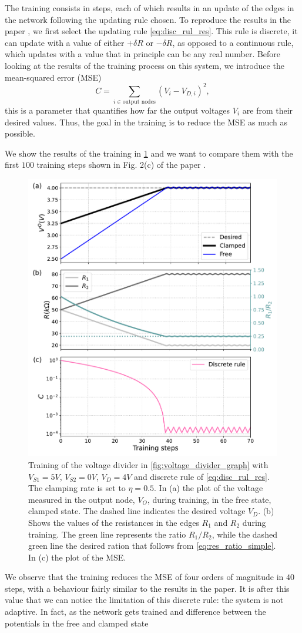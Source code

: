 \documentclass[10.5pt]{article}
\begin{document}
The training consists in steps, each of which results in an update of the edges in the network following the updating rule chosen. To reproduce the results in the paper \cite{Dillavou}, we first select the updating rule \cref{eq:disc_rul_res}. This rule is discrete, it can update with a value of either $+\delta R$ or $-\delta R$, as opposed to a continuous rule, which updates with a value that in principle can be any real number. Before looking at the results of the training process on this system, we introduce the mean-squared error (MSE)
\[
C = \sum_{i \in \text{output nodes}} (V_{i} - V_{D,i})^2,
\]
this is a parameter that quantifies how far the output voltages $V_i$ are from their desired values. Thus, the goal in the training is to reduce the MSE as much as possible.

We show the results of the training in \cref{fig:voltage_div_1} and we want to compare them with the first $100$ training steps shown in Fig. 2(c) of the paper \cite{Dillvaou}. 
\begin{figure}[h]
    \centering
    \includegraphics[width=0.5\columnwidth]{../figures_tex/volt_res_mse_simp.pdf}
    \caption{Training of the voltage divider in \cref{fig:voltage_divider_graph} with $V_{S1}=5V$, $V_{S2}=0V$, $V_{D}=4V$ and discrete rule of \cref{eq:disc_rul_res}. The clamping rate is set to $\eta=0.5$. In (a) the plot of the voltage measured in the output node, $V_O$, during training, in the free state, clamped state. The dashed line indicates the desired voltage $V_D$. (b) Shows the values of the resistances in the edges $R_1$ and $R_2$ during training. The green line represents the ratio $R_1/R_2$, while the dashed green line the desired ration that follows from \cref{eq:res_ratio_simple}. In (c) the plot of the MSE.}
    \label{fig:voltage_div_1}
\end{figure} 
We observe that the training reduces the MSE of four orders of magnitude in $40$ steps, with a behaviour fairly similar to the results in the paper. It is after this value that we can notice the limitation of this discrete rule: the system is not adaptive. In fact, as the network gets trained and difference between the potentials in the free and clamped state
\end{document}
